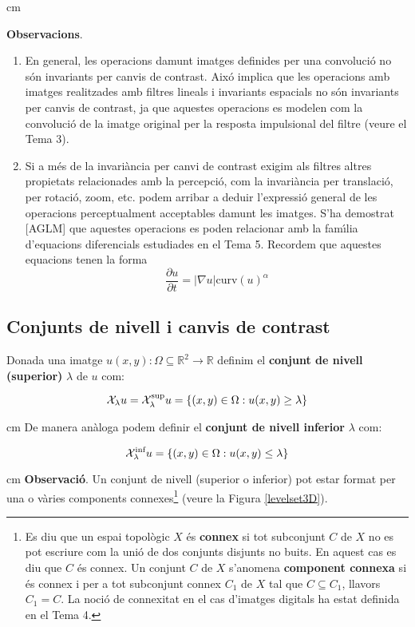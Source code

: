 \documentclass{article}
\def\R{\mathbb R}
\begin{document}
 cm

\noindent
{\bf Observacions}. 
\begin{enumerate}
\item En general, les operacions damunt imatges definides per una convoluci\'o no s\'on invariants
per canvis de contrast. Aix\'o implica que  les operacions amb imatges realitzades amb filtres lineals
i invariants espacials no s\'on invariants per canvis de contrast, ja que aquestes operacions es modelen com la
convoluci\'o de la imatge original per la resposta impulsional del filtre (veure el Tema 3).

\item Si a m\'es de la invari\`ancia per canvi de contrast exigim als filtres altres propietats relacionades
amb la percepci\'o, com la invari\`ancia per translaci\'o, per rotaci\'o, zoom, etc. podem arribar a deduir
l'expressi\'o general de les operacions perceptualment acceptables damunt les imatges. S'ha demostrat [AGLM] que 
aquestes operacions es poden relacionar amb la fam\'\i lia d'equacions diferencials estudiades
en el Tema 5. Recordem que aquestes equacions tenen la forma
\[
\frac{\partial u}{\partial t}=|\nabla u| \text{curv}(u)^\alpha
\]

\end{enumerate}

\subsection{Conjunts de nivell i canvis de contrast} 
\noindent
Donada una imatge $u(x, y): \Omega \subseteq \R^2 \longrightarrow \R$ definim el {\bf conjunt de nivell (superior)} 
$\lambda$ de $u$ com:

\begin{equation}
\label{upperlevelset}
{\cal X}_\lambda u = {\cal X}_\lambda^\text{sup} u = \{ (x, y) \in \Omega : u(x, y) \geq \lambda \}
\end{equation}

 cm
\noindent
De manera an\`aloga podem definir el {\bf conjunt de nivell inferior} $\lambda$ com:

\begin{equation}
\label{lowerlevelset}
{\cal X}_\lambda^\text{inf} u = \{ (x, y) \in \Omega : u(x, y) \leq \lambda \}
\end{equation}


 cm
\noindent
{\bf Observaci\'o}. Un conjunt de nivell (superior o inferior) pot estar format per una o v\`aries 
components connexes\footnote{Es diu que un espai topol\`ogic $X$ \'es {\bf connex}
si tot subconjunt $C$ de $X$ 
no es pot escriure com la uni\'o de dos conjunts disjunts no buits. En aquest cas es diu que $C$ \'es connex.
Un conjunt $C$ de $X$ 
s'anomena {\bf component connexa} si \'es connex i per a tot subconjunt connex $C_1$ de $X$ 
tal que $C \subseteq C_1$, llavors $C_1=C$. La noci\'o de connexitat en el cas d'imatges digitals
ha estat definida en el Tema 4.} (veure la Figura \ref{levelset3D}).
\end{document}
